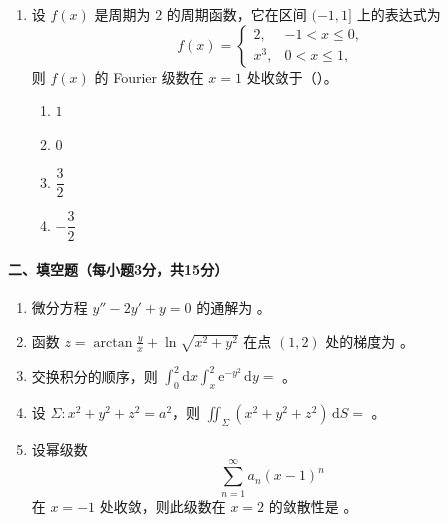 \begin{enumerate}
  \item 设 \(f(x)\) 是周期为 \(2\) 的周期函数，它在区间 \((-1,1]\) 上的表达式为
  \[
    f(x)=
    \begin{cases}
      2, & -1<x\le 0,\\
      x^3, & 0<x\le 1,
    \end{cases}
  \]
  则 \(f(x)\) 的 Fourier 级数在 \(x=1\) 处收敛于（\quad）。
  \begin{enumerate}
    \item[A.] \(1\)
    \item[B.] \(0\)
    \item[C.] \(\dfrac32\)
    \item[D.] \(-\dfrac32\)
  \end{enumerate}
\end{enumerate}

\paragraph*{二、填空题（每小题3分，共15分）}
\begin{enumerate}
  \item 微分方程 \(y''-2y'+y=0\) 的通解为 \underline{\hspace{5cm}}。
  \item 函数 \(\displaystyle z=\arctan\frac{y}{x}+\ln\sqrt{x^2+y^2}\) 在点 \((1,2)\) 处的梯度为 \underline{\hspace{5cm}}。
  \item 交换积分的顺序，则 \(\displaystyle \int_0^2\mathrm{d}x\int_x^2 \mathrm{e}^{-y^2}\,\mathrm{d}y=\) \underline{\hspace{5cm}}。
  \item 设 \(\Sigma:x^2+y^2+z^2=a^2\)，则
  \(\displaystyle \iint_\Sigma (x^2+y^2+z^2)\,\mathrm{d}S=\) \underline{\hspace{5cm}}。
  \item 设幂级数
  \[
    \sum_{n=1}^{\infty}a_n(x-1)^n
  \]
  在 \(x=-1\) 处收敛，则此级数在 \(x=2\) 的敛散性是 \underline{\hspace{5cm}}。
\end{enumerate}

